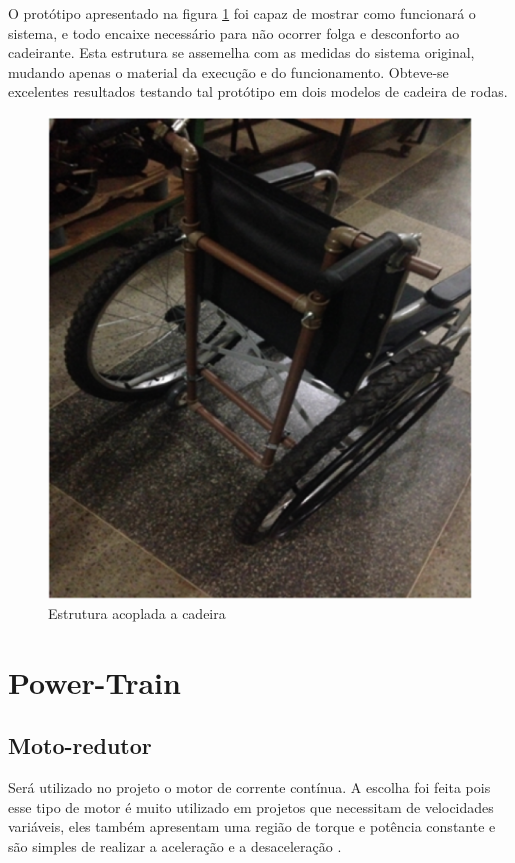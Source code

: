 O protótipo apresentado na figura \ref{fig:estr_prototipo} foi capaz de mostrar como funcionará o sistema, e todo encaixe necessário para não ocorrer folga e desconforto ao cadeirante. Esta estrutura se assemelha com as medidas do sistema original, mudando apenas o material da execução e do funcionamento. Obteve-se excelentes resultados testando tal protótipo em dois modelos de cadeira de rodas.

\begin{figure}[!htb]
\centering
\includegraphics[keepaspectratio=true,scale=0.7]{figuras/resultados/estr_prototipo}
\caption{Estrutura acoplada a cadeira}
\label{fig:estr_prototipo}
\end{figure}

\section{Power-Train}

\subsection{Moto-redutor}

Será utilizado no projeto o motor de corrente contínua. A escolha foi feita pois esse tipo de motor é muito utilizado em projetos que necessitam de velocidades variáveis, eles também apresentam uma região de torque e potência constante e são simples de realizar a aceleração e a desaceleração \cite{manual_bateria_unipower}.

